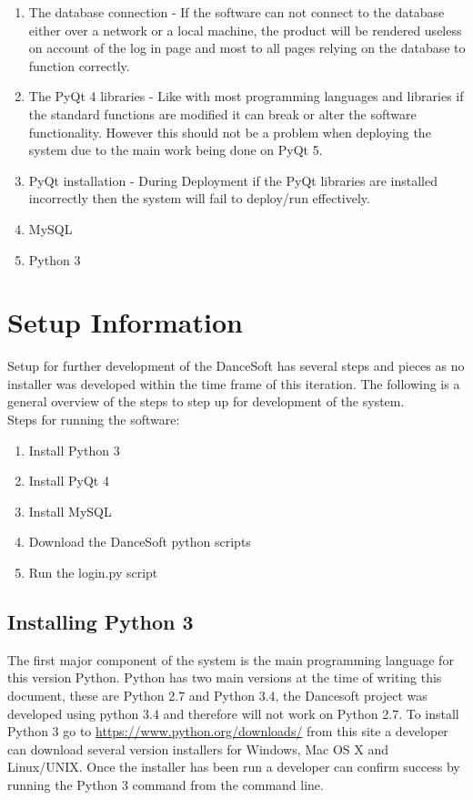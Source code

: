\begin{enumerate}
\item The database connection - If the software can not connect to the database either over a network or a local machine, the product will be rendered useless on account of the log in page and most to all pages relying on the database to function correctly.
\item The PyQt 4 libraries - Like with most programming languages and libraries if the standard functions are modified it can break or alter the software functionality. However this should not be a problem when deploying the system due to the main work being done on PyQt 5.
\item PyQt installation - During Deployment if the PyQt libraries are installed incorrectly then the system will fail to deploy/run effectively.
\item MySQL
\item Python 3
\end{enumerate}



\section{Setup Information}
Setup for further development of the DanceSoft has several steps and pieces as no installer was developed within the time frame of this iteration. The following is a general overview of the steps to step up for development of the system.\\

Steps for running the software:\\

\begin{enumerate}
\item Install Python 3
\item Install PyQt 4
\item Install MySQL
\item Download the DanceSoft python scripts
\item Run the login.py script
\end{enumerate}

\subsection{Installing Python 3}
The first major component of the system is the main programming language for this version Python. Python has two main versions at the time of writing this document, these are Python 2.7 and Python 3.4, the Dancesoft project was developed using python 3.4 and therefore will not work on Python 2.7.
To install Python 3 go to \url{https://www.python.org/downloads/} from this site a developer can download several version installers for Windows, Mac OS X and Linux/UNIX. Once the installer has been run a developer can confirm success by running the Python 3 command from the command line.

